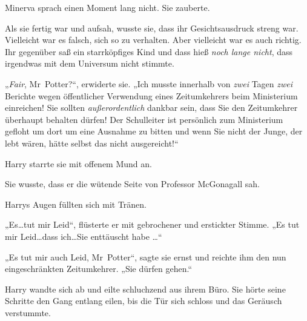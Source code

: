 Minerva sprach einen Moment lang nicht. Sie zauberte.

Als sie fertig war und aufsah, wusste sie, dass ihr Gesichtsausdruck streng war. Vielleicht war es falsch, sich so zu verhalten. Aber vielleicht war es auch richtig. Ihr gegenüber saß ein starrköpfiges Kind und dass hieß \emph{noch lange nicht}, dass irgendwas mit dem Universum nicht stimmte.

„\emph{Fair}, Mr~Potter?“, erwiderte sie. „Ich musste innerhalb von \emph{zwei} Tagen \emph{zwei} Berichte wegen öffentlicher Verwendung eines Zeitumkehrers beim Ministerium einreichen! Sie sollten \emph{außerordentlich} dankbar sein, dass Sie den Zeitumkehrer überhaupt behalten dürfen! Der Schulleiter ist persönlich zum Ministerium gefloht um dort um eine Ausnahme zu bitten und wenn Sie nicht der Junge, der lebt wären, hätte selbst das nicht ausgereicht!“

Harry starrte sie mit offenem Mund an.

Sie wusste, dass er die wütende Seite von Professor McGonagall sah.

Harrys Augen füllten sich mit Tränen.

„Es…tut mir Leid“, flüsterte er mit gebrochener und erstickter Stimme. „Es tut mir Leid…dass ich…Sie enttäuscht habe …“

„Es tut mir auch Leid, Mr~Potter“, sagte sie ernst und reichte ihm den nun eingeschränkten Zeitumkehrer. „Sie dürfen gehen.“

Harry wandte sich ab und eilte schluchzend aus ihrem Büro. Sie hörte seine Schritte den Gang entlang eilen, bis die Tür sich schloss und das Geräusch verstummte.

